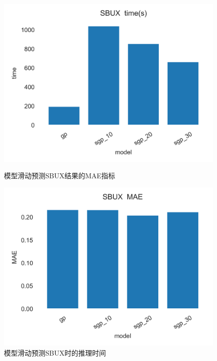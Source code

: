 \begin{figure}[!htbp]
    \centering
    \begin{minipage}[t]{0.49\textwidth}
    \centering
    \includegraphics[width=\textwidth]{images/lab3/SBUX_time.png}
    \caption{模型滑动预测SBUX结果的MAE指标}\label{3SBUXtime}
    \end{minipage}
    \begin{minipage}[t]{0.49\textwidth}
    \centering
    \includegraphics[width=\textwidth]{images/lab3/SBUX_MAE.png}
    \caption{模型滑动预测SBUX时的推理时间}\label{3SBUXMAE}
    \end{minipage}
\end{figure}
